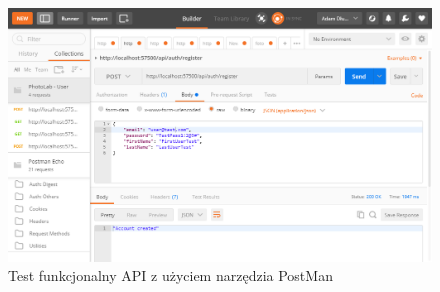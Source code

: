  \begin{figure}[ht]
	\centering
	\includegraphics[width=1\linewidth]{graphics/chapter-5/functional-tests.png}
	\caption{Test funkcjonalny API z użyciem narzędzia PostMan}
	\label{fig:functional-tests}
\end{figure}


\newpage
